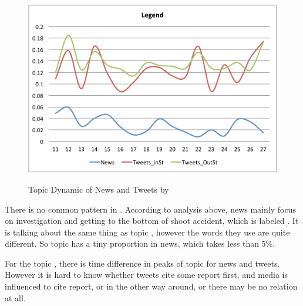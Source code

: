 \begin{figure}[htpb]
{\label{fig:news_report}
}
\includegraphics[width=0.5\linewidth]{figures/4_Legend_cut.pdf}
\caption{Topic Dynamic of News and Tweets by \stlda}\label{fig:topics_news_tweets}
\end{figure}

There is no common pattern in \michaelbrown. According to analysis above, news mainly focus on investigation and getting to the bottom of shoot accident, which is labeled \shootincident. It is talking about the same thing as topic \michaelbrown, however the words they use are quite different. So \michaelbrown topic has a tiny proportion in news, which takes less than 5\%.

For the topic \newsreport, there is time difference in peaks of topic for news and tweets. However it is hard to know whether tweets cite some report first, and media is influenced to cite report, or in the other way around, or there may be no relation at all. 